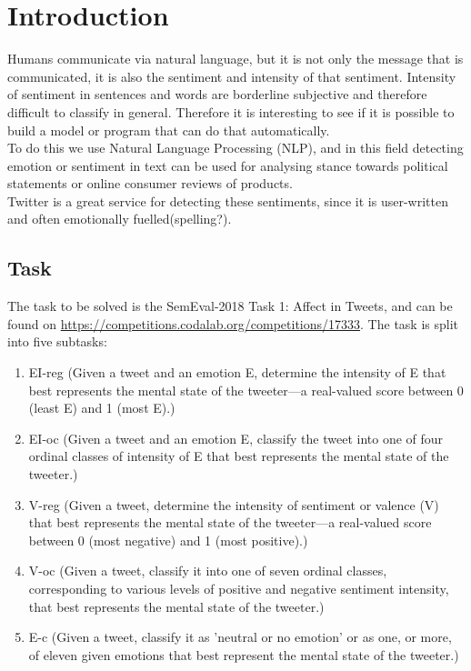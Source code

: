 \section{Introduction}
Humans communicate via natural language, but it is not only the message that is communicated, it is also the sentiment and intensity of that sentiment. Intensity of sentiment in sentences and words are borderline subjective and therefore difficult to classify in general. Therefore it is interesting to see if it is possible to build a model or program that can do that automatically. \\
To do this we use Natural Language Processing (NLP), and in this field detecting emotion or sentiment in text can be used for analysing stance towards political statements or online consumer reviews of products. \\
Twitter is a great service for detecting these sentiments, since it is user-written and often emotionally fuelled(spelling?).
\subsection{Task}
The task to be solved is the SemEval-2018 Task 1: Affect in Tweets, and can be found on \hyperref[https://competitions.codalab.org/competitions/17333]{https://competitions.codalab.org/competitions/17333}. The task is split into five subtasks:\\
\begin{enumerate}
\item EI-reg (Given a tweet and an emotion E, determine the  intensity of E that best represents the mental state of the tweeter—a real-valued score between 0 (least E) and 1 (most E).)
\item EI-oc (Given a tweet and an emotion E, classify the tweet into one of four ordinal classes of intensity of E that best represents the mental state of the tweeter.)
\item V-reg (Given a tweet, determine the intensity of sentiment or valence (V) that best represents the mental state of the tweeter—a real-valued score between 0 (most negative) and 1 (most positive).)
\item V-oc (Given a tweet, classify it into one of seven ordinal classes, corresponding to various levels of positive and negative sentiment intensity, that best represents the mental state of the tweeter.)
\item E-c (Given a tweet, classify it as 'neutral or no emotion' or as one, or more, of eleven given emotions that best represent the mental state of the tweeter.)
\end{enumerate}
 
